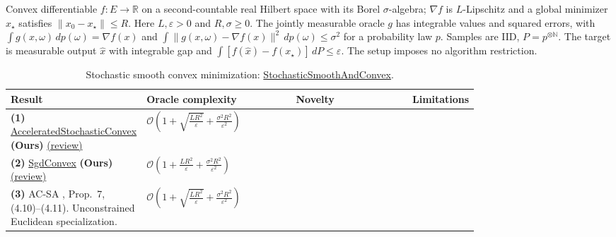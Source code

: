 \begin{table}[tp]
\centering
\caption{Stochastic smooth convex minimization: \href{https://github.com/k3nfalt/longtails/blob/main/LongTails/Setups/StochasticSmoothAndConvex.lean}{StochasticSmoothAndConvex}.}\label{tab:StochasticSmoothAndConvex}
\parbox{\linewidth}{\footnotesize Convex differentiable $f:E\to\mathbb R$ on a second-countable real Hilbert space with its Borel $\sigma$-algebra; $\nabla f$ is $L$-Lipschitz and a global minimizer $x_\star$ satisfies $\|x_0-x_\star\|\le R$. Here $L,\varepsilon>0$ and $R,\sigma\ge0$. The jointly measurable oracle $g$ has integrable values and squared errors, with $\int g(x,\omega)\,dp(\omega)=\nabla f(x)$ and $\int\|g(x,\omega)-\nabla f(x)\|^2\,dp(\omega)\le\sigma^2$ for a probability law $p$. Samples are IID, $P=p^{\otimes\mathbb N}$. The target is measurable output $\widehat x$ with integrable gap and $\int[f(\widehat x)-f(x_\star)]\,dP\le\varepsilon$. The setup imposes no algorithm restriction.}\par\smallskip
\begin{threeparttable}
\footnotesize
\setlength{\tabcolsep}{4pt}\renewcommand{\arraystretch}{1.25}
\begin{tabularx}{\linewidth}{@{}>{\raggedright\arraybackslash}p{0.20\linewidth}>{\raggedright\arraybackslash}p{0.32\linewidth}>{\raggedright\arraybackslash}p{0.25\linewidth}>{\raggedright\arraybackslash}X@{}}
\toprule
\textbf{Result} & \textbf{Oracle complexity} & \textbf{Novelty} & \textbf{Limitations} \\
\midrule
\textbf{(1)} \href{https://github.com/k3nfalt/longtails/blob/main/LongTails/Theorems/AcceleratedStochasticConvex.lean}{Accelerated\allowbreak Stochastic\allowbreak Convex} \textbf{(Ours)} \href{https://github.com/k3nfalt/longtails/blob/main/scripts/reviews/AcceleratedStochasticConvex.md}{(review)}
& $\mathcal{O}\!\left(1+\sqrt{\frac{LR^2}{\varepsilon}}+\frac{\sigma^2R^2}{\varepsilon^2}\right)$ & & \\
\midrule
\textbf{(2)} \href{https://github.com/k3nfalt/longtails/blob/main/LongTails/Theorems/SgdConvex.lean}{Sgd\allowbreak Convex} \textbf{(Ours)} \href{https://github.com/k3nfalt/longtails/blob/main/scripts/reviews/SgdConvex.md}{(review)}
& $\mathcal{O}\!\left(1+\frac{LR^2}{\varepsilon}+\frac{\sigma^2R^2}{\varepsilon^2}\right)$ & & \\
\midrule[1.2pt]
\textbf{(3)} AC-SA \citep{sscGhadimiLan2012}, Prop.~7, (4.10)--(4.11). Unconstrained Euclidean specialization.
& $\mathcal{O}\!\left(1+\sqrt{\frac{LR^2}{\varepsilon}}+\frac{\sigma^2R^2}{\varepsilon^2}\right)$

\end{tabularx}
\end{threeparttable}
\end{table}
